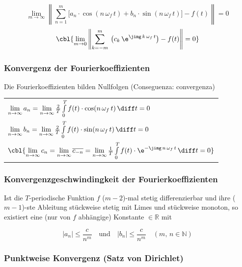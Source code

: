 $$ \lim \limits_{m \to \infty} \left\|\sum\limits _{n=1}^m \big[ a_n \cdot \cos(n \, 
\omega_f \, t) + b_n \cdot \sin(n \, \omega_f \, t) \big] - f(t) \right\| = 0 $$
$$ \cbl{\lim \limits_{m \to 0} \left\| \sum\limits _{k= -m}^m \: \big( c_k \, \e^{ \jimg \, k \, \omega_f \, t} \big) - f(t) \right\| = 0} $$


\subsubsection{Konvergenz der Fourierkoeffizienten}

Die Fourierkoeffizienten bilden Nullfolgen (Conseguenza: convergenza)

\renewcommand{\arraystretch}{2}
\begin{tabular}{l}
    $\lim \limits_{n \to \infty} a_n = \lim \limits_{n \to \infty} \frac{2}{T} \int \limits_0^T f(t) \cdot \cos(n\, \omega_f \, t) \, \diff t = 0$                                                                  \\
    $\lim \limits_{n \to \infty} b_n = \lim \limits_{n \to \infty} \frac{2}{T} \int \limits_0^T f(t) \cdot \sin(n\, \omega_f \, t) \, \diff t = 0$                                                                  \\
    $\cbl{\lim \limits_{n \to \infty} c_n = \lim \limits_{n \to \infty} \overline{c_{-n}} = \lim \limits_{n \to\infty} \frac{1}{T} \int \limits_0^T f(t) \cdot  \e^{- \jimg \, n \, \omega_f \, t} \, \diff t = 0}$
\end{tabular}
\renewcommand{\arraystretch}{1}


\subsubsection{Konvergenzgeschwindingkeit der Fourierkoeffizienten}

Ist die $T$-periodische Funktion $f$ ($m-2$)-mal stetig differenzierbar und ihre ($m-1$)-ste Ableitung stückweise stetig mit Limes und 
stückweise monoton, so existiert eine (nur von $f$ abhängige) Konstante $\in \mathbb{R}$ mit

$$ \vert a_n \vert \leq \frac{c}{n^m} \quad \text{und} \quad \vert b_n \vert \leq \frac{c}{n^m} \quad (m, \, n \in \mathbb{N}) $$


\subsubsection{Punktweise Konvergenz (Satz von Dirichlet)}\label{chapt:punktweise_konvergenz}


